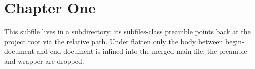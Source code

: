 \documentclass[../main]{subfiles}
\begin{document}
\section{Chapter One}
This subfile lives in a subdirectory; its subfiles-class preamble points
back at the project root via the relative path. Under flatten only the
body between begin-document and end-document is inlined into the merged
main file; the preamble and wrapper are dropped.
\end{document}
